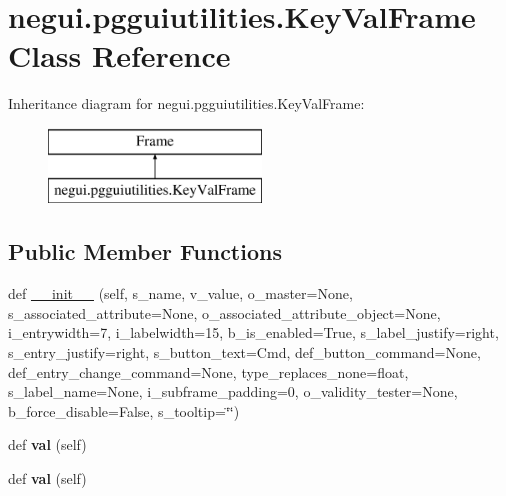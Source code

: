 \hypertarget{classnegui_1_1pgguiutilities_1_1KeyValFrame}{}\section{negui.\+pgguiutilities.\+Key\+Val\+Frame Class Reference}
\label{classnegui_1_1pgguiutilities_1_1KeyValFrame}
Inheritance diagram for negui.\+pgguiutilities.\+Key\+Val\+Frame\+:\begin{figure}[H]
\begin{center}
\leavevmode
\includegraphics[height=2.000000cm]{classnegui_1_1pgguiutilities_1_1KeyValFrame}
\end{center}
\end{figure}
\subsection*{Public Member Functions}
\begin{DoxyCompactItemize}
\item 
def \hyperlink{classnegui_1_1pgguiutilities_1_1KeyValFrame_a42badee6f48e787eb50911528d0381aa}{\+\_\+\+\_\+init\+\_\+\+\_\+} (self, s\+\_\+name, v\+\_\+value, o\+\_\+master=None, s\+\_\+associated\+\_\+attribute=None, o\+\_\+associated\+\_\+attribute\+\_\+object=None, i\+\_\+entrywidth=7, i\+\_\+labelwidth=15, b\+\_\+is\+\_\+enabled=True, s\+\_\+label\+\_\+justify=\textquotesingle{}right\textquotesingle{}, s\+\_\+entry\+\_\+justify=\textquotesingle{}right\textquotesingle{}, s\+\_\+button\+\_\+text=\textquotesingle{}Cmd\textquotesingle{}, def\+\_\+button\+\_\+command=None, def\+\_\+entry\+\_\+change\+\_\+command=None, type\+\_\+replaces\+\_\+none=float, s\+\_\+label\+\_\+name=None, i\+\_\+subframe\+\_\+padding=0, o\+\_\+validity\+\_\+tester=None, b\+\_\+force\+\_\+disable=False, s\+\_\+tooltip=\char`\"{}\char`\"{})
\item 
def {\bfseries val} (self)\hypertarget{classnegui_1_1pgguiutilities_1_1KeyValFrame_a735c32759de5e4519d15ec2511da6e4f}{}\label{classnegui_1_1pgguiutilities_1_1KeyValFrame_a735c32759de5e4519d15ec2511da6e4f}

\item 
def {\bfseries val} (self)\hypertarget{classnegui_1_1pgguiutilities_1_1KeyValFrame_a735c32759de5e4519d15ec2511da6e4f}{}\label{classnegui_1_1pgguiutilities_1_1KeyValFrame_a735c32759de5e4519d15ec2511da6e4f}

\end{DoxyCompactItemize}
